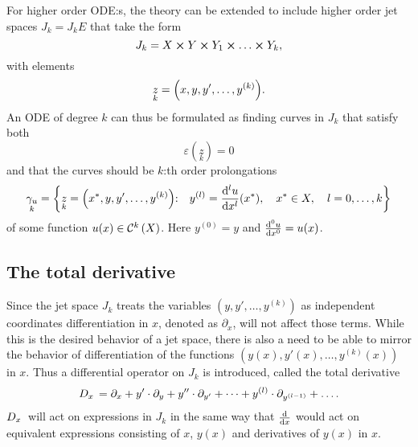 For higher order ODE:s, the theory can be extended to include higher order jet spaces \(J_k = J_k E\) that take the form
\begin{equation}
  J_k = X \cross Y \cross Y_1 \cross \dots \cross Y_k,
\end{equation}
with elements
\begin{equation}
  \underset{k}{z} = \qty(x, y, y', \dots, y^{(k)}).
\end{equation}
An ODE of degree \(k\) can thus be formulated as finding curves in \(J_k\) that satisfy both
\begin{equation}
  \varepsilon(\underset{k}{z}) = 0
\end{equation}
and that the curves should be \(k\):th order prolongations
\begin{equation}
  \underset{k}{\gamma_u} = \qty{\underset{k}{z} = \qty(\fixed{x}, y, y', \dots, y^{(k)})\qq*{:} y^{(l)} = \dv[l]{u}{x}{(\fixed{x})}\qc \fixed{x} \in X\qc l = 0, \dots, k}
\end{equation}
of some function \(u(x) \in \cont{k}{X}\).
Here \(y^{(0)} = y\) and \(\dv[0]{u}{x} = u(x)\).

\subsection{The total derivative}

Since the jet space \(J_k\) treats the variables \((y, y', \dots, y^{(k)})\) as independent coordinates differentiation in \(x\), denoted as \(\partial_x\), will not affect those terms.
While this is the desired behavior of a jet space, there is also a need to be able to mirror the behavior of differentiation of the functions \((y(x), y'(x), \dots, y^{(k)}(x))\) in \(x\).
Thus a differential operator on \(J_k\) is introduced, called the total derivative
\begin{equation}
  D_{x}\, = \partial_x + y' \cdot \partial_y + y'' \cdot \partial_{y'} + \dots + y^{(l)} \cdot \partial_{y^{(l-1)}} + \dots .
\end{equation}
\(D_{x}\,\) will act on expressions in \(J_k\) in the same way that \(\dv{x}\) would act on equivalent expressions consisting of \(x\), \(y(x)\) and derivatives of \(y(x)\) in \(x\).

